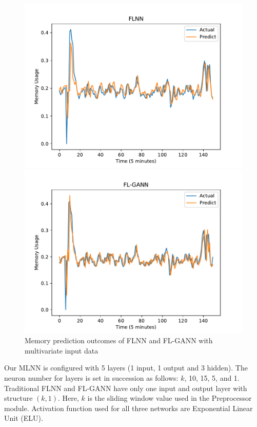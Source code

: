 \documentclass[conference]{IEEEtran}
\begin{document}
\begin{figure}[h]
	\centering
	\begin{minipage}[t]{8cm}
		\centering
		\includegraphics[width=0.8\textwidth =0.2cm 0.2cm 0.2cm 0.2cm]{images/multi_ram_flnn.pdf}
	\end{minipage}
	\hspace{0.5cm}
	\begin{minipage}[t]{8cm}
		\centering
		\includegraphics[width=0.8\textwidth =0.2cm 0.2cm 0.2cm 0.2cm]{images/multi_ram_flgann.pdf}
	\end{minipage}
	\caption{Memory prediction outcomes of FLNN and FL-GANN with multivariate input data} 
	\label{tn1_multi_RAM}
\end{figure}

Our MLNN is configured with 5 layers (1 input, 1 output and 3 hidden). The neuron number for layers is set in succession as follows: $k$, 10, 15, 5, and 1. Traditional FLNN and FL-GANN have only one input and output layer with structure $(k, 1)$. Here, $k$ is the sliding window value used in the Preprocessor module. Activation function used for all three networks are Exponential Linear Unit (ELU). 
\end{document}
